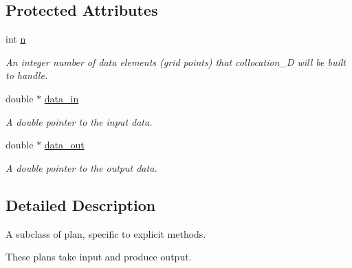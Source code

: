 \subsection*{Protected Attributes}
\begin{DoxyCompactItemize}
\item 
\hypertarget{classbases_1_1explicit__plan_a6acccce0b2ef4489b411a264cab019c9}{int \hyperlink{classbases_1_1explicit__plan_a6acccce0b2ef4489b411a264cab019c9}{n}}\label{classbases_1_1explicit__plan_a6acccce0b2ef4489b411a264cab019c9}

\begin{DoxyCompactList}\small\item\em An integer number of data elements (grid points) that collocation\-\_\-D will be built to handle. \end{DoxyCompactList}\item 
\hypertarget{classbases_1_1explicit__plan_a8faf976ec6c01951dd6d5e7421630184}{double $\ast$ \hyperlink{classbases_1_1explicit__plan_a8faf976ec6c01951dd6d5e7421630184}{data\-\_\-in}}\label{classbases_1_1explicit__plan_a8faf976ec6c01951dd6d5e7421630184}

\begin{DoxyCompactList}\small\item\em A double pointer to the input data. \end{DoxyCompactList}\item 
\hypertarget{classbases_1_1explicit__plan_a55946d0b4b1a19da12469447de247b82}{double $\ast$ \hyperlink{classbases_1_1explicit__plan_a55946d0b4b1a19da12469447de247b82}{data\-\_\-out}}\label{classbases_1_1explicit__plan_a55946d0b4b1a19da12469447de247b82}

\begin{DoxyCompactList}\small\item\em A double pointer to the output data. \end{DoxyCompactList}\end{DoxyCompactItemize}


\subsection{Detailed Description}
A subclass of plan, specific to explicit methods. 



 These plans take input and produce output. 

